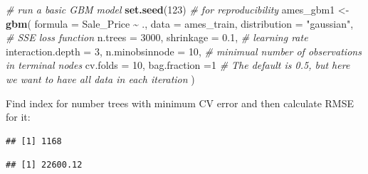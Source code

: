 \documentclass[
  10pt,
  ignorenonframetext,
]{beamer}
\newenvironment{Shaded}{\begin{snugshade}}{\end{snugshade}}
\newcommand{\AttributeTok}[1]{\textcolor[rgb]{0.13,0.29,0.53}{#1}}
\newcommand{\CommentTok}[1]{\textcolor[rgb]{0.56,0.35,0.01}{\textit{#1}}}
\newcommand{\DecValTok}[1]{\textcolor[rgb]{0.00,0.00,0.81}{#1}}
\newcommand{\FloatTok}[1]{\textcolor[rgb]{0.00,0.00,0.81}{#1}}
\newcommand{\FunctionTok}[1]{\textcolor[rgb]{0.13,0.29,0.53}{\textbf{#1}}}
\newcommand{\NormalTok}[1]{#1}
\newcommand{\OtherTok}[1]{\textcolor[rgb]{0.56,0.35,0.01}{#1}}
\newcommand{\SpecialCharTok}[1]{\textcolor[rgb]{0.81,0.36,0.00}{\textbf{#1}}}
\newcommand{\StringTok}[1]{\textcolor[rgb]{0.31,0.60,0.02}{#1}}
\begin{document}
\begin{frame}[fragile]
\scriptsize

\begin{Shaded}
\begin{Highlighting}[]
\CommentTok{\# run a basic GBM model}
\FunctionTok{set.seed}\NormalTok{(}\DecValTok{123}\NormalTok{)  }\CommentTok{\# for reproducibility}
\NormalTok{ames\_gbm1 }\OtherTok{\textless{}{-}} \FunctionTok{gbm}\NormalTok{(}
  \AttributeTok{formula =}\NormalTok{ Sale\_Price }\SpecialCharTok{\textasciitilde{}}\NormalTok{ .,}
  \AttributeTok{data =}\NormalTok{ ames\_train,}
  \AttributeTok{distribution =} \StringTok{"gaussian"}\NormalTok{,  }\CommentTok{\# SSE loss function}
  \AttributeTok{n.trees =} \DecValTok{3000}\NormalTok{,}
  \AttributeTok{shrinkage =} \FloatTok{0.1}\NormalTok{, }\CommentTok{\# learning rate}
  \AttributeTok{interaction.depth =} \DecValTok{3}\NormalTok{,}
  \AttributeTok{n.minobsinnode =} \DecValTok{10}\NormalTok{, }\CommentTok{\# minimual number of observations in terminal nodes}
  \AttributeTok{cv.folds =} \DecValTok{10}\NormalTok{,}
  \AttributeTok{bag.fraction =}\DecValTok{1} \CommentTok{\# The default is 0.5, but here we want to have all data in each iteration}
\NormalTok{)}
\end{Highlighting}
\end{Shaded}

\normalsize

Find index for number trees with minimum CV error and then calculate
RMSE for it:

\vspace{2mm}

\scriptsize

\begin{Shaded}
\end{Shaded}

\begin{verbatim}
## [1] 1168
\end{verbatim}

\begin{Shaded}
\end{Shaded}

\begin{verbatim}
## [1] 22600.12
\end{verbatim}
\end{frame}
\end{document}
